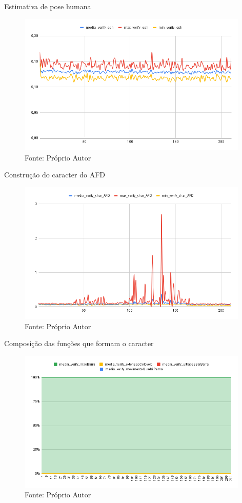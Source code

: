 \begin{frame}{Estimativa de pose humana}
   \begin{figure}[H]
    \includegraphics[width=11cm]{img/resultados/eph.png}
    {Fonte: Próprio Autor}
    \label{figura:configs_server}
    \end{figure}
\end{frame}

\begin{frame}{Construção do caracter do AFD}
   \begin{figure}[H]
    \includegraphics[width=11cm]{img/resultados/char_AFD.png}
    {Fonte: Próprio Autor}
    \label{figura:configs_server}
    \end{figure}
\end{frame}

\begin{frame}{Composição das funções que formam o caracter }
   \begin{figure}[H]
    \includegraphics[width=11cm]{img/resultados/comp_char_AFD.png}
    {Fonte: Próprio Autor}
    \label{figura:configs_server}
    \end{figure}
\end{frame}

